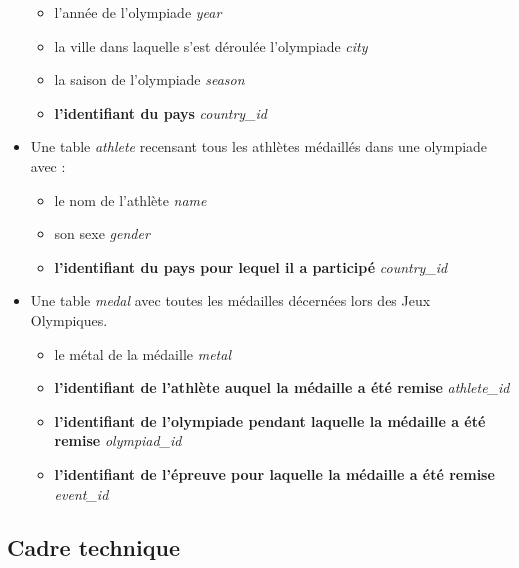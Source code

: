 \documentclass{article}
\begin{document}
\begin{itemize}
\begin{itemize}
\item l'année de l'olympiade \textit{year}

\item la ville dans laquelle s'est déroulée l'olympiade \textit{city}

\item la saison de l'olympiade \textit{season}

\item \textbf{l'identifiant du pays} \textit{country\_id}

\end{itemize}

\item
Une table \textit{athlete} recensant tous les athlètes médaillés dans une olympiade avec :

\begin{itemize}

\item le nom de l'athlète \textit{name}

\item son sexe \textit{gender}

\item \textbf{l'identifiant du pays pour lequel il a participé} \textit{country\_id}

\end{itemize}

\item
Une table \textit{medal} avec toutes les médailles décernées lors des Jeux Olympiques.

\begin{itemize}

\item le métal de la médaille \textit{metal}

\item \textbf{l'identifiant de l'athlète auquel la médaille a été remise} \textit{athlete\_id}

\item \textbf{l'identifiant de l'olympiade pendant laquelle la médaille a été remise} \textit{olympiad\_id}

\item \textbf{l'identifiant de l'épreuve pour laquelle la médaille a été remise} \textit{event\_id}

\end{itemize}

\end{itemize}

\subsection{Cadre technique}
\end{document}
